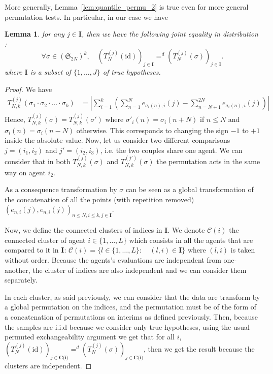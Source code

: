 \documentclass{article}
\theoremstyle{plain}
\newtheorem{Lemma}{Lemma}
\theoremstyle{remark}
\renewcommand{\S}{\mathfrak{S}}
\newcommand{\1}{\mathbbm{1}}
\newcommand{\id}{\mathrm{id}}
\numberwithin{equation}{section}
\begin{document}
More generally, Lemma~\ref{lem:quantile_permu_2} is true even for more general permutation tests. In particular, in our case we have

\begin{Lemma}
for any $j \in \textbf{I}$, then we have the following joint equality in distribution :
$$\forall \sigma \in (\S_{2N})^k, \quad (T_N^{(j)}(\id))_{j \in\textbf{I}} =^d (T_N^{(j)}(\sigma))_{j \in \textbf{I}}.$$
where $\textbf{I}$ is a subset of $\{1,\dots,J\}$ of true hypotheses.
\end{Lemma}
\begin{proof}
We have
\begin{align*}
T_{N,k}^{(j)}(\sigma_1 \cdot  \sigma_2 \cdot  \ldots  \cdot  \sigma_k)&=  \left|\sum_{i=1}^k\left(\sum_{n=1}^{N} e_{\sigma_i(n),i}(j)-\sum_{n=N+1}^{2N} e_{\sigma_i(n),i}(j)\right)\right|
\end{align*}
Hence, $T_{N,k}^{(j)}(\sigma) = T_{N,k}^{(j)}(\sigma')$ where $\sigma'_i(n)=\sigma_i(n+N)$ if $n \le N$ and $\sigma_i(n) = \sigma_i(n-N)$ otherwise. This corresponds to changing the sign $-1$ to $+1$ inside the absolute value. Now, let us consider two different comparisons $j=(i_1,i_2)$ and $j'=(i_2,i_3)$, i.e. the two couples share one agent. We can consider that in both $T_{N,k}^{(j)}(\sigma)$ and $T_{N,k}^{(j')}(\sigma)$ the permutation acts in the same way on agent $i_2$.

As a consequence transformation by $\sigma$ can be seen as a global transformation of the concatenation of all the points (with repetition removed) $(e_{n,i}(j), e_{n,i}(j))_{n\le N, i\le k,j\in \textbf{I}}$. 

Now, we define the connected clusters of indices in $\textbf{I}$. We denote $\mathcal{C}(i)$ the connected cluster of agent $i \in \{1,\dots,L\}$ which consists in all the agents that are compared to it in $\textbf{I}$: $\mathcal{C}(i)=\{l \in  \{1,\dots,L\}:\quad  (l,i)\in \textbf{I}\}$ where $(l,i)$ is taken without order. Because the agents's evaluations are independent from one-another, the cluster of indices are also independent and we can consider them separately. 

In each cluster, as said previously, we can consider that the data are transform by a global permutation on the indices, and the permutation must be of the form of a concatenation of permutations on interims as defined previously. Then, because the samples are i.i.d because we consider only true hypotheses, using the usual permuted exchangeability argument  we get that for all $i$, $(T_N^{(j)}(\id))_{j \in\textbf{C(i)}} =^d (T_N^{(j)}(\sigma))_{j \in \textbf{C(i)}}$, then we get the result because the clusters are independent.
\end{proof}
\end{document}
